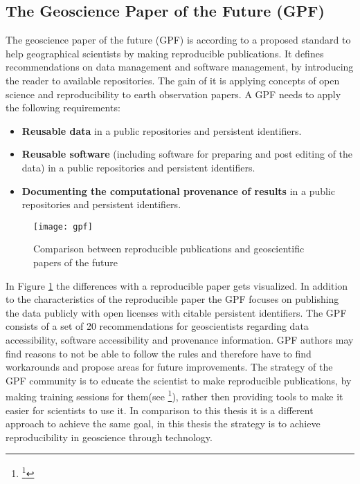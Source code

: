 \documentclass[draft,final]{vutinfth} %
\begin{document}
\subsection{The Geoscience Paper of the Future (GPF)}\label{GPF}

The geoscience paper of the future (GPF) is according to \cite{Gil2016TowardTG} a proposed standard to help geographical scientists by making reproducible publications. It defines recommendations on data management and software management, by introducing the reader to available repositories. The gain of it is applying concepts of open science and reproducibility to earth observation papers. A GPF needs to apply the following requirements:

\begin{itemize}
	\item \textbf{Reusable data} in a public repositories and persistent identifiers.
	\item \textbf{Reusable software} (including software for preparing and post editing of the data) in a  public repositories and persistent identifiers.
	\item \textbf{Documenting the computational provenance of results} in a public repositories and persistent identifiers.  
\end{itemize}

\begin{figure}[h]
	\centering
	\texttt{[image: gpf]}
	\caption{Comparison between reproducible publications and geoscientific papers of the future \cite{Gil2016TowardTG}}
	\label{fig:gpf} %
\end{figure}

In Figure \ref{fig:gpf} the differences with a reproducible paper gets visualized. In addition to the characteristics of the reproducible paper the GPF focuses on publishing the data publicly with open licenses with citable persistent identifiers.
The GPF consists of a set of 20 recommendations for geoscientists regarding data accessibility, software accessibility and provenance information. GPF authors may find reasons to not be able to follow the rules and therefore have to find workarounds and propose areas for future improvements. The strategy of the GPF community is to educate the scientist to make reproducible publications, by making training sessions for them(see \footnote{\footnote{http://scientificpaperofthefuture.org/gpf/events.html}}), rather then providing tools to make it easier for scientists to use it. In comparison to this thesis it is a different approach to achieve the same goal, in this thesis the strategy is to achieve reproducibility in geoscience through technology. 
\end{document}
